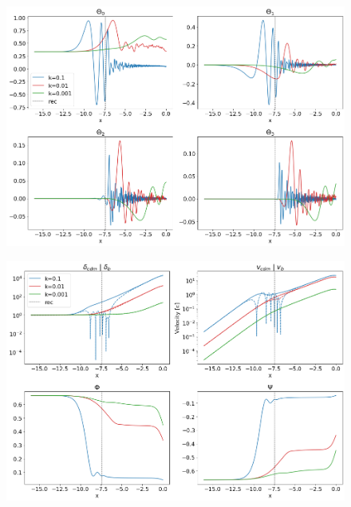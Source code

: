 \documentclass[10pt, a4paper]{article}
\begin{document}
\begin{figure}[H]
    \centering
    \includegraphics[scale=0.45]{../m3_figs/thetas.png}
    \caption{}
    \label{}
\end{figure}


\begin{figure}[H]
    \centering
    \includegraphics[scale=0.45]{../m3_figs/pertubations.png}
    \caption{}
    \label{}
\end{figure}




\end{document}
